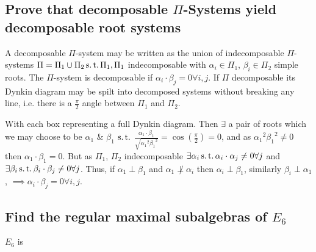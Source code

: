 \documentclass[main.tex]{subfiles}
\begin{document}
\subsection{Prove that decomposable $\Pi$-Systems yield decomposable root systems}

A decomposable $\Pi$-system may be written as the union of indecomposable $\Pi$-systems $\Pi=\Pi_1\cup\Pi_2\operatorname{s.t.}\Pi_1,\Pi_1$ indecomposable with $\alpha_i\in\Pi_1$, $\beta_i\in\Pi_2$ simple roots. The $\Pi$-system is decomposable if $\alpha_i\cdot\beta_j=0\forall i,j$. If $\Pi$ decomposable its Dynkin diagram may be spilt into decomposed systems without breaking any line, i.e. there is a $\frac{\pi}{2}$ angle between $\Pi_1$ and $\Pi_2$.

\begin{figure}[H] 
\centering
\end{figure}
With each box representing a full Dynkin diagram. Then $\exists$ a pair of roots which we may choose to be $\alpha_1$ \& $\beta_1$ $\operatorname{s.t.}$ $\frac{\alpha_1\cdot\beta_1}{\sqrt{{\alpha_1}^2{\beta_1}^2}}=\cos{(\frac{\pi}{2})}=0$, and as ${\alpha_1}^2{\beta_1}^2\neq0$ then $\alpha_1\cdot\beta_1=0$. But as $\Pi_1$, $\Pi_2$ indecomposable $\exists\alpha_i\operatorname{s.t.}\alpha_i\cdot\alpha_j\neq0\forall j$ and $\exists\beta_i\operatorname{s.t.}\beta_i\cdot\beta_j\neq0\forall j$. Thus, if $\alpha_1\perp\beta_1$ and $\alpha_1\not\perp\alpha_i$ then $\alpha_i\perp\beta_1$, similarly $\beta_i\perp\alpha_1$, $\implies\alpha_i\cdot\beta_j=0\forall i,j$.

\subsection{Find the regular maximal subalgebras of $E_6$}
$E_6$ is 
\begin{center}
\end{center}
\end{document}
